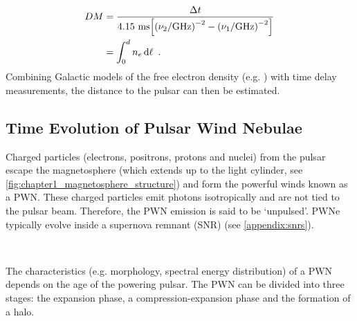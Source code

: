 \begin{equation}
    \begin{aligned}
        DM&= \frac{\Delta t}{4.15~\si{\milli\second}\qty[\qty(\nu_2/\si{\giga\hertz})^{-2}-\qty(\nu_1/\si{\giga\hertz})^{-2}]}\\
        &= \int_0^dn_e \dd{\ell}\text{ .}
    \end{aligned} \label{eq:chapter_1_dispersion_measurement}
\end{equation}
\noindent Combining Galactic models of the free electron density (e.g. \cite{2017ApJ...835...29Y}) with time delay measurements, the distance to the pulsar can then be estimated.
 
\subsection{Time Evolution of Pulsar Wind Nebulae} \label{sec:01_intro_time_ev_PWN}
Charged particles (electrons, positrons, protons and nuclei) from the pulsar escape the magnetosphere (which extends up to the light cylinder, see \autoref{fig:chapter1_magnetosphere_structure}) and form the powerful winds known as a PWN. These charged particles
emit photons isotropically and are not tied to the pulsar beam. Therefore, the PWN emission is said to be `unpulsed'. PWNe typically evolve inside a supernova remnant (SNR) (see \autoref{appendix:snrs}).
\par~\par
The characteristics (e.g. morphology, spectral energy distribution) of a PWN depends on the age of the powering pulsar. The PWN can be divided into three stages: the expansion phase, a compression-expansion phase and the formation of a halo.

